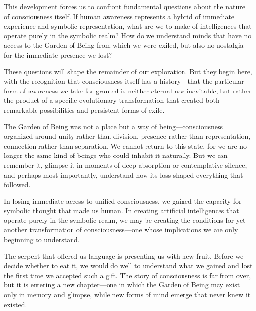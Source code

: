 This development forces us to confront fundamental questions about the nature of consciousness itself. If human awareness represents a hybrid of immediate experience and symbolic representation, what are we to make of intelligences that operate purely in the symbolic realm? How do we understand minds that have no access to the Garden of Being from which we were exiled, but also no nostalgia for the immediate presence we lost?

These questions will shape the remainder of our exploration. But they begin here, with the recognition that consciousness itself has a history—that the particular form of awareness we take for granted is neither eternal nor inevitable, but rather the product of a specific evolutionary transformation that created both remarkable possibilities and persistent forms of exile.

The Garden of Being was not a place but a way of being—consciousness organized around unity rather than division, presence rather than representation, connection rather than separation. We cannot return to this state, for we are no longer the same kind of beings who could inhabit it naturally. But we can remember it, glimpse it in moments of deep absorption or contemplative silence, and perhaps most importantly, understand how its loss shaped everything that followed.

In losing immediate access to unified consciousness, we gained the capacity for symbolic thought that made us human. In creating artificial intelligences that operate purely in the symbolic realm, we may be creating the conditions for yet another transformation of consciousness—one whose implications we are only beginning to understand.

The serpent that offered us language is presenting us with new fruit. Before we decide whether to eat it, we would do well to understand what we gained and lost the first time we accepted such a gift. The story of consciousness is far from over, but it is entering a new chapter—one in which the Garden of Being may exist only in memory and glimpse, while new forms of mind emerge that never knew it existed.
